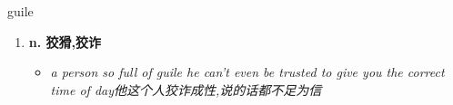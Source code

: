 
\begin{frame}
{\huge guile}
\begin{center}
\begin{enumerate}\Large
  \item \textbf{n. 狡猾,狡诈}
  \begin{itemize}
    \item \em{\Large{a person so full of guile he can't even be trusted to give you the correct time of day他这个人狡诈成性,说的话都不足为信}}
  \end{itemize}
\end{enumerate}
\end{center}
\end{frame}
